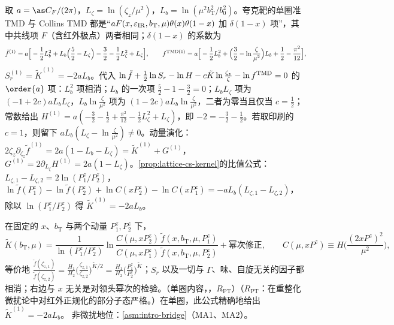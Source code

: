 \begin{example}\label{ex:lamet-qtmd-oneloop}
取 $a=\as C_F/(2\pi)$，$L_\zeta=\ln(\zeta_z/\mu^2)$，$L_b=\ln(\mu^2b_{\mathrm T}^2/b_0^2)$。夸克靶的单圈准 TMD 与 Collins TMD 都是“$aF(x,\varepsilon_{\rm IR},b_{\mathrm T},\mu)\theta(x)\theta(1-x)$ 加 $\delta(1-x)$ 项”，其中共线项 $F$（含红外极点）两者相同\cite{JiEtAl2021}；$\delta(1-x)$ 的系数为
\[
\tilde f^{(1)}=a\Big[-\frac12L_b^2+L_b\Big(\frac52-L_\zeta\Big)-\frac32-\frac12L_\zeta^2+L_\zeta\Big],\qquad
f^{{\rm TMD}(1)}=a\Big[-\frac12L_b^2+\Big(\frac32-\ln\frac\zeta{\mu^2}\Big)L_b+\frac12-\frac{\pi^2}{12}\Big],
\]%
$S_r^{(1)}=\tilde K^{(1)}=-2aL_b$。代入 $\ln\tilde f+\frac12\ln S_r-\ln H-c\tilde K\ln\frac{\zeta_z}\zeta-\ln f^{\rm TMD}=0$ 的 $\order{a}$ 项：$L_b^2$ 项相消；$L_b$ 的一次项 $\frac52-1-\frac32=0$；$L_bL_\zeta$ 项为 $(-1+2c)aL_bL_\zeta$，$L_b\ln\frac\zeta{\mu^2}$ 项为 $(1-2c)aL_b\ln\frac\zeta{\mu^2}$，二者为零当且仅当 $c=\frac12$；常数给出 $H^{(1)}=a(-\frac32-\frac12+\frac{\pi^2}{12}-\frac12L_\zeta^2+L_\zeta)$，即 $-2=-\frac32-\frac12$。若取印刷的 $c=1$，则留下 $aL_b(L_\zeta-\ln\frac\zeta{\mu^2})\neq0$。动量演化：$2\zeta_z\partial_{\zeta_z}\tilde f^{(1)}=2a(1-L_b-L_\zeta)=\tilde K^{(1)}+G^{(1)}$，$G^{(1)}=2\partial_{L_\zeta}H^{(1)}=2a(1-L_\zeta)$。\cref{prop:lattice-cs-kernel}的比值公式：$L_{\zeta,1}-L_{\zeta,2}=2\ln(P^z_1/P^z_2)$，$\ln\tilde f(P^z_1)-\ln\tilde f(P^z_2)+\ln C(xP^z_2)-\ln C(xP^z_1)=-aL_b(L_{\zeta,1}-L_{\zeta,2})$，除以 $\ln(P^z_1/P^z_2)$ 得 $\tilde K^{(1)}=-2aL_b$。
\end{example}

\begin{proposition}\label{prop:lattice-cs-kernel}
在固定的 $x$、$b_{\mathrm T}$ 与两个动量 $P_1^z,P_2^z$ 下，
\begin{equation}\label{eq:lamet-cs}
\tilde K(b_{\mathrm T},\mu)=\frac1{\ln(P_1^z/P_2^z)}\ln\frac{C(\mu,xP_2^z)\,\tilde f(x,b_{\mathrm T},\mu,P_1^z)}{C(\mu,xP_1^z)\,\tilde f(x,b_{\mathrm T},\mu,P_2^z)}+\text{幂次修正},\qquad C(\mu,xP^z)\equiv H\Big(\frac{(2xP^z)^2}{\mu^2}\Big),
\end{equation}%
等价地 $\frac{\tilde f(\zeta_{z,1})}{\tilde f(\zeta_{z,2})}=\frac{H_1}{H_2}\big(\frac{\zeta_{z,1}}{\zeta_{z,2}}\big)^{\tilde K/2}=\frac{H_1}{H_2}\big(\frac{P^z_1}{P^z_2}\big)^{\tilde K}$；$S_r$ 以及一切与 $\Gamma$、味、自旋无关的因子都相消；右边与 $x$ 无关是对领头幂次的检验。（单圈内容，\tagR，$R_{\mathrm{PT}}$）（$R_{\mathrm{PT}}$：在重整化微扰论中对红外正规化的部分子态严格。）在单圈，此公式精确地给出 $\tilde K^{(1)}=-2aL_b$。
非微扰地位：\cref{asm:intro-bridge}（MA1、MA2）。
\end{proposition}


